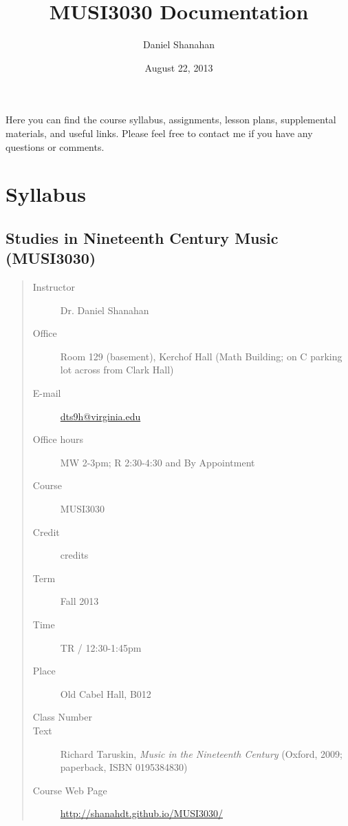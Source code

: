 \documentclass[letterpaper,10pt,english]{sphinxmanual}
\title{MUSI3030 Documentation}
\date{August 22, 2013}
\author{Daniel Shanahan}
\begin{document}
\maketitle
\tableofcontents
{}\label{index::doc}


Here you can find the course syllabus, assignments, lesson plans, supplemental materials, and useful links. Please feel free to contact me if you have any questions or comments.


\chapter{Syllabus}
\label{syllabus:welcome-to-class-website-for-musi3030-nineteenth-century-music}\label{syllabus:syllabus}\label{syllabus::doc}

\section{Studies in Nineteenth Century Music (MUSI3030)}
\label{syllabus:studies-in-nineteenth-century-music-musi3030}\begin{quote}\begin{description}
\item[{Instructor}] \leavevmode
Dr. Daniel Shanahan

\item[{Office}] \leavevmode
Room 129 (basement), Kerchof Hall (Math Building; on C parking lot across from Clark Hall)

\item[{E-mail}] \leavevmode
\href{mailto:dts9h@virginia.edu}{dts9h@virginia.edu}

\item[{Office hours}] \leavevmode
MW 2-3pm; R 2:30-4:30 and By Appointment

\item[{Course}] \leavevmode
MUSI3030

\item[{Credit}]  credits

\item[{Term}] \leavevmode
Fall 2013

\item[{Time}] \leavevmode
TR / 12:30-1:45pm

\item[{Place}] \leavevmode
Old Cabel Hall, B012

\item[{Class Number}] 

\item[{Text}] \leavevmode
Richard Taruskin, \emph{Music in the Nineteenth Century} (Oxford, 2009; paperback, ISBN 0195384830)

\item[{Course Web Page}] \leavevmode
\href{http://shanahdt.github.io/MUSI3030/}{http://shanahdt.github.io/MUSI3030/}

\end{description}\end{quote}
\end{document}
